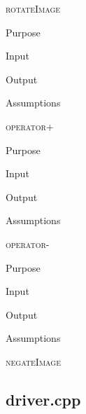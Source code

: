 \documentclass[pdftex, 11pt]{article}
\begin{document}
\begin{description}
	\item{\textsc{rotateImage}}
		\begin{description}
			\item{Purpose}


			\item{Input}


			\item{Output}


			\item{Assumptions}


		\end{description}


	\item{\textsc{operator+}}
		\begin{description}
			\item{Purpose}


			\item{Input}


			\item{Output}


			\item{Assumptions}


		\end{description}


	\item{\textsc{operator-}}
		\begin{description}
			\item{Purpose}


			\item{Input}


			\item{Output}


			\item{Assumptions}


		\end{description}


	\item{\textsc{negateImage}}

\end{description}

\subsection{driver.cpp}
\end{document}
